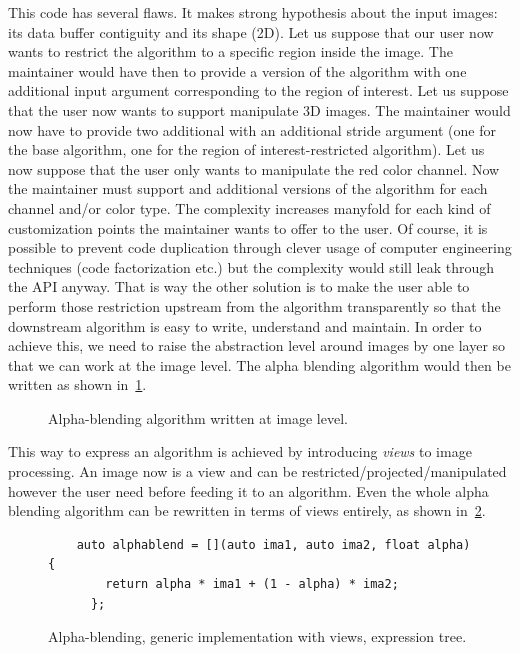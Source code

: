 This code has several flaws. It makes strong hypothesis about the input images: its data buffer contiguity and its shape (2D). Let us suppose that our user now wants to restrict the algorithm to a specific region inside the image. The maintainer would have then to provide a version of the algorithm with one additional input argument corresponding to the region of interest. Let us suppose that the user now wants to support manipulate 3D images. The maintainer would now have to provide two additional with an additional stride argument (one for the base algorithm, one for the region of interest-restricted algorithm). Let us now suppose that the user only wants to manipulate the red color channel. Now the maintainer must support and additional versions of the algorithm for each channel and/or color type. The complexity increases manyfold for each kind of customization points the maintainer wants to offer to the user. Of course, it is possible to prevent code duplication through clever usage of computer engineering techniques (code factorization etc.) but the complexity would still leak through the API anyway. That is way the other solution is to make the user able to perform those restriction upstream from the algorithm transparently so that the downstream algorithm is easy to write, understand and maintain. In order to achieve this, we need to raise the abstraction level around images by one layer so that we can work at the image level. The alpha blending algorithm would then be written as shown in~\cref{fig.view.alphablend}.

\begin{figure}[tbh]
  \centering
  

  \caption{Alpha-blending algorithm written at image level.}
  \label{fig.view.alphablend}
\end{figure}

This way to express an algorithm is achieved by introducing \emph{views} to image processing. An image now is a view and can be restricted/projected/manipulated however the user need before feeding it to an algorithm. Even the whole alpha blending algorithm can be rewritten in terms of views entirely, as shown in~\cref{fig.new.alphablend}.

\begin{figure}[tbh]
  \centering
  \begin{minipage}[b]{5.5cm}
    
  \end{minipage}
  \begin{minipage}[b]{5.5cm}
    \begin{verbatim}
    auto alphablend = [](auto ima1, auto ima2, float alpha) {
        return alpha * ima1 + (1 - alpha) * ima2;
      };
    \end{verbatim}
    \bigskip
    \bigskip
    \bigskip
  \end{minipage}
  \caption{Alpha-blending, generic implementation with views, expression tree.}
  \label{fig.new.alphablend}
\end{figure}

